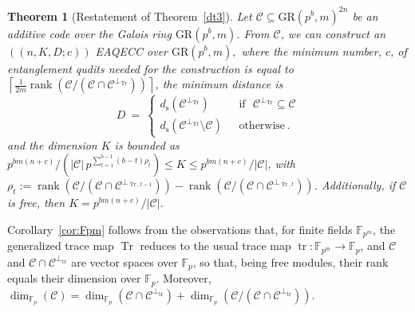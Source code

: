 \documentclass{article}
\DeclareMathOperator{\tr}{tr}
\DeclareMathOperator{\Tr}{Tr}
\DeclareMathOperator{\rank}{rank}
\def\F{\mathbb{F}}
\newtheorem{thm}{Theorem}[section]
\theoremstyle{remark}
\theoremstyle{definition}
\numberwithin{equation}{section}
\begin{document}
\begin{thm}[Restatement of Theorem~\ref{dt3}] Let $\mathcal{C} \subseteq \text{GR}(p^b,m)^{2n}$ be an additive code over the Galois ring $\text{GR}(p^b,m)$.   From $\mathcal{C}$, we can construct an  $((n,K,D;c))$ EAQECC over $\text{GR}(p^b,m),$ where the minimum number, $c$, of entanglement qudits needed for the construction is equal to  $\left\lceil \frac1{2m}\rank(\mathcal{C}/(\mathcal{C} \cap \mathcal{C}^{\perp_{{\Tr}}}))  \right\rceil$, the minimum distance is 
\begin{equation*}
D~=~\left\{\begin{array}{ll}
d_{\mathrm{s}}(\mathcal{C}^{\perp_{{\Tr}}}) & \text{~~if~~} \mathcal{C}^{\perp_{{\Tr}}} \subseteq \mathcal{C} \\
d_{\mathrm{s}}(\mathcal{C}^{\perp_{{\Tr}}}\setminus \mathcal{C} )  & \text{~~otherwise}\,.
\end{array}\right.
\end{equation*}
and the dimension $K$ is bounded as $p^{bm(n+c)}/ (|\mathcal{C}| \, {p^{\sum_{t=1}^{b-1} (b-t)\rho_t}}) \leq  K \leq p^{bm(n+c)}/|\mathcal{C}|$, with $\rho_t := \rank(\mathcal{C}/(\mathcal{C} \cap \mathcal{C}^{\perp_{\Tr,t-1}}))-\rank(\mathcal{C}/(\mathcal{C} \cap \mathcal{C}^{\perp_{\Tr,t}}))$. Additionally, if $\mathcal{C}$ is free, then $K = p^{bm(n+c)}/|\mathcal{C}|$.
\end{thm}

Corollary~\ref{cor:Fpm} follows from the observations that, for finite fields $\F_{p^m}$, the generalized trace map $\Tr$ reduces to the usual trace map $\tr: \F_{p^m} \to \F_p$, and $\mathcal{C}$ and $\mathcal{C} \cap \mathcal{C}^{\perp_{\tr}}$ are vector spaces over $\F_p$, so that, being free modules, their rank equals their dimension over $\F_p$. Moreover, $\dim_{\F_p}(\mathcal{C}) = \dim_{\F_p}(\mathcal{C} \cap \mathcal{C}^{\perp_{\tr}}) + \dim_{\F_p}(\mathcal{C} / (\mathcal{C} \cap \mathcal{C}^{\perp_{\tr}}))$.


\end{document}

